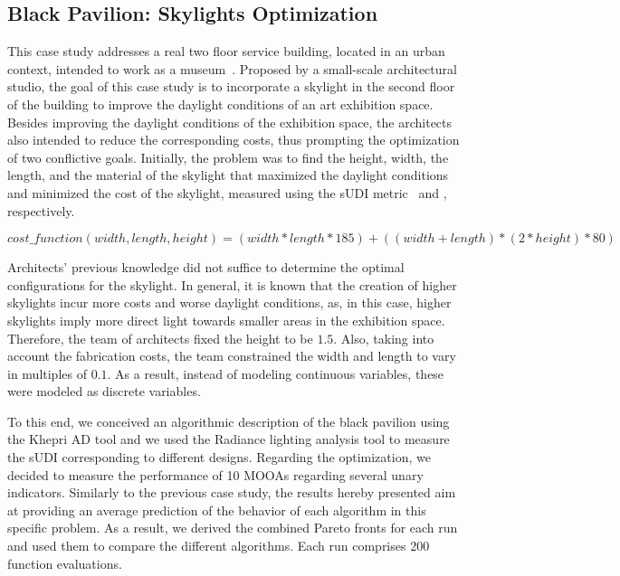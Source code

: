 \subsection{Black Pavilion: Skylights Optimization}
This case study addresses a real two floor service building, located in an urban context, intended to work as a museum~\cite{Caetano2018,IP2019MOO}. Proposed by a small-scale architectural studio, the goal of this case study is to incorporate a skylight in the second floor of the building to improve the daylight conditions of an art exhibition space. Besides improving the daylight conditions of the exhibition space, the architects also intended to reduce the corresponding costs, thus prompting the optimization of two conflictive goals. Initially, the problem was to find the height, width, the length, and the material of the skylight that maximized the daylight conditions and minimized the cost of the skylight, measured using the \ac{sUDI} metric~\cite{Nabil2006} and  , respectively. 

\begin{equation} \label{eq:costanalysis}
cost\_function(width, length, height) = (width * length * 185) + ((width + length) * ( 2 * height) * 80)
\end{equation}

Architects' previous knowledge did not suffice to determine the optimal configurations for the skylight. In general, it is known that the creation of higher skylights incur more costs and worse daylight conditions, as, in this case, higher skylights imply more direct light towards smaller areas in the exhibition space. Therefore, the team of architects fixed the height to be $1.5$\metre. Also, taking into account the fabrication costs, the team constrained the width and length to vary in multiples of $0.1$\metre. As a result, instead of modeling continuous variables, these were modeled as discrete variables.

To this end, we conceived an algorithmic description of the black pavilion using the Khepri \ac{AD} tool and we used the Radiance lighting analysis tool to measure the \ac{sUDI} corresponding to different designs. Regarding the optimization, we decided to measure the performance of 10 \acp{MOOA} regarding several unary indicators. Similarly to the previous case study, the results hereby presented aim at providing an average prediction of the behavior of each algorithm in this specific problem. As a result, we derived the combined Pareto fronts for each run and used them to compare the different algorithms. Each run comprises 200 function evaluations.

